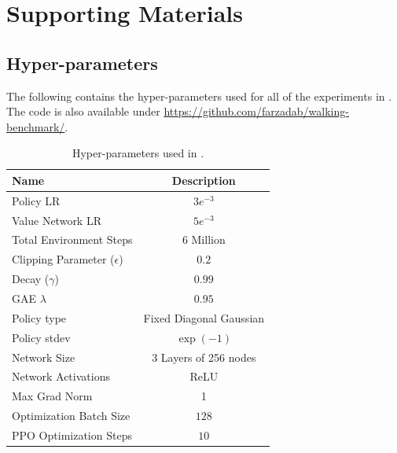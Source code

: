 \chapter{Supporting Materials}




\section{ Hyper-parameters}
\label{sec:envparam_hyperparams}

The following contains the hyper-parameters used for all of the experiments in . The code is also available under \url{https://github.com/farzadab/walking-benchmark/}.
\begin{table}[h]
    \centering
    \begin{tabular}{lc}
        \toprule
        Name & Description \\
        \midrule
        Policy LR & $3e^{-3}$\\
        Value Network LR & $5e^{-3}$\\
        Total Environment Steps & $6$ Million\\
        Clipping Parameter ($\epsilon$) & $0.2$\\
        Decay ($\gamma$) & $0.99$\\
        GAE $\lambda$ & $0.95$ \\
        Policy type & Fixed Diagonal Gaussian\\
        Policy stdev & $\exp(-1)$\\
        Network Size & 3 Layers of 256 nodes \\
        Network Activations & ReLU \\
        Max Grad Norm & 1\\
        Optimization Batch Size & $128$ \\
        PPO Optimization Steps & $10$ \\
        \bottomrule
    \end{tabular}
    \caption{Hyper-parameters used in .}
    \label{tab:envparam_hyperparams}
\end{table}

